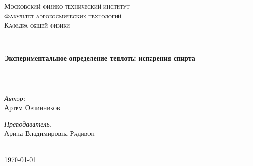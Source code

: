 \documentclass[1 pt]{article}
\begin{document}
\begin{titlepage}
\newcommand{\HRule}{\rule{\linewidth}{0.3 mm}} %

\center %
 

\textsc{\Large Московский физико-технический институт }\\[1.5cm] %
\textsc{\Large Факультет аэрокосмических технологий}\\[0.5cm] %
\textsc{\large Кафедра общей физики}\\[0.5cm] %


\HRule \\[0.4cm]
{ \huge \bfseries Экспериментальное определение теплоты испарения спирта }\\[0.4cm] %
\HRule \\[1.5cm]
 

\begin{minipage}{0.4\textwidth}
\begin{flushleft} \large
\emph{Автор:}\\ Артем \textsc{Овчинников} %
\end{flushleft}
\end{minipage}
\begin{minipage}{0.4\textwidth}
\begin{flushright} \large
\emph{Преподаватель:} \\
Арина Владимировна \textsc{Радивон} %
\end{flushright}
\end{minipage}\\[4cm]

{\large \today}\\[2cm] %


 

\vfill %

\end{titlepage}
\tableofcontents
\newpage
\end{document}
